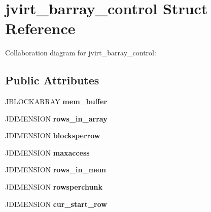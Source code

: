 \hypertarget{structjvirt__barray__control}{\section{jvirt\+\_\+barray\+\_\+control Struct Reference}
\label{structjvirt__barray__control}
}


Collaboration diagram for jvirt\+\_\+barray\+\_\+control\+:
\subsection*{Public Attributes}
\begin{DoxyCompactItemize}
\item 
\hypertarget{structjvirt__barray__control_a8afb55dcf60348a5ae746e19315f745e}{J\+B\+L\+O\+C\+K\+A\+R\+R\+A\+Y {\bfseries mem\+\_\+buffer}}\label{structjvirt__barray__control_a8afb55dcf60348a5ae746e19315f745e}

\item 
\hypertarget{structjvirt__barray__control_a57c1bf0ff557df3e1e0926e367a6b635}{J\+D\+I\+M\+E\+N\+S\+I\+O\+N {\bfseries rows\+\_\+in\+\_\+array}}\label{structjvirt__barray__control_a57c1bf0ff557df3e1e0926e367a6b635}

\item 
\hypertarget{structjvirt__barray__control_a6c148bce80b027c114ec7d37221cd175}{J\+D\+I\+M\+E\+N\+S\+I\+O\+N {\bfseries blocksperrow}}\label{structjvirt__barray__control_a6c148bce80b027c114ec7d37221cd175}

\item 
\hypertarget{structjvirt__barray__control_a47ffc73c735353eaac752145847cfc92}{J\+D\+I\+M\+E\+N\+S\+I\+O\+N {\bfseries maxaccess}}\label{structjvirt__barray__control_a47ffc73c735353eaac752145847cfc92}

\item 
\hypertarget{structjvirt__barray__control_a23aa025027bba6a29287b1460d72bf71}{J\+D\+I\+M\+E\+N\+S\+I\+O\+N {\bfseries rows\+\_\+in\+\_\+mem}}\label{structjvirt__barray__control_a23aa025027bba6a29287b1460d72bf71}

\item 
\hypertarget{structjvirt__barray__control_ad31f701b81d11db2bd5fa33579d9674e}{J\+D\+I\+M\+E\+N\+S\+I\+O\+N {\bfseries rowsperchunk}}\label{structjvirt__barray__control_ad31f701b81d11db2bd5fa33579d9674e}

\item 
\hypertarget{structjvirt__barray__control_ae1e7828cda2f39e8ffdd7e0cc4336f76}{J\+D\+I\+M\+E\+N\+S\+I\+O\+N {\bfseries cur\+\_\+start\+\_\+row}}\label{structjvirt__barray__control_ae1e7828cda2f39e8ffdd7e0cc4336f76}


\end{DoxyCompactItemize}
